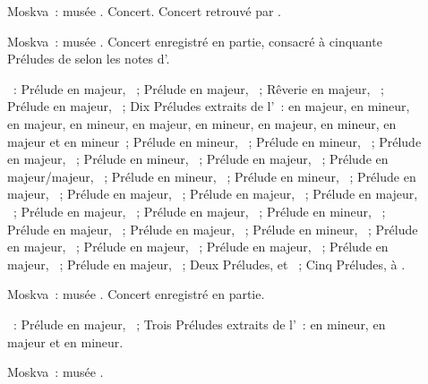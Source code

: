 \begin{description}
 \item[]
 Moskva~: musée \Scriabine{}.
 Concert.
 Concert retrouvé par \citet{TADGO1960}.
 \item[]
 Moskva~: musée \Scriabine{}.
 Concert enregistré en partie, consacré à cinquante Préludes de \Scriabine{}
 selon les notes d'\ASofronitsky{}.

 \textsc{\Scriabine{}}~: Prélude en \kE \Flat majeur,  ~;
 Prélude en \kF majeur,  ~; Rêverie en \kC majeur,
  ~; Prélude en \kE \Flat majeur,  ~;
 Dix Préludes extraits de l'~:  en \kG \Flat majeur,
  en \kE \Flat mineur,  en \kD \Flat majeur,
  en \kB \Flat mineur,  en \kA \Flat majeur,
  en \kF mineur,  en \kE \Flat majeur,  en
 \kG mineur,  en \kF majeur et  en \kD mineur~;
 Prélude en \kE \Flat mineur,  ~; Prélude en \kF mineur,
  ~; Prélude en \kB \Flat majeur,  ~;
 Prélude en \kG mineur,  ~; Prélude en \kB majeur,
  ~; Prélude en \kD \Flat majeur/\kC majeur, 
 ~; Prélude en \kF \Sharp mineur,  ~; Prélude
 en \kE \Flat mineur,  ~; Prélude en \kC majeur,
  ~; Prélude en \kE majeur,  ~;
 Prélude en \kF \Sharp majeur,  ~; Prélude en \kC majeur,
  ~; Prélude en \kD \Flat majeur,  ~;
 Prélude en \kB \Flat majeur,  ~; Prélude en \kB \Flat
 mineur,  ~; Prélude en \kF \Sharp majeur, 
 ~; Prélude en \kB majeur,  ~; Prélude en \kG
 mineur,  ~; Prélude en \kD majeur, 
 ~; Prélude en \kG majeur,  ~; Prélude en \kA
 \Flat majeur,  ~; Prélude en \kF \Sharp majeur,
  ~; Prélude en \kC majeur,  ~; Deux
 Préludes,   et ~; Cinq Préludes, 
  à .
 \item[]
 Moskva~: musée \Scriabine{}.
 Concert enregistré en partie.

 \textsc{\Scriabine{}}~: Prélude en \kB majeur,  ~; Trois
 Préludes extraits de l'~:  en \kE mineur,  en
 \kD majeur et  en \kB mineur.
 \item[]
 Moskva~: musée \Scriabine{}.


\end{description}
